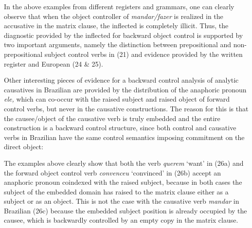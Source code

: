 \documentclass[output=paper]{langsci/langscibook}
\begin{document}
In the above examples from different registers and grammars, one can clearly observe that when the object controller of \textit{mandar\slash fazer} is realized in the accusative in the matrix clause, the inflected  is completely illicit. Thus, the diagnostic provided by the inflected  for backward object control is supported by two important arguments, namely the distinction between prepositional and non{}-prepositional subject control verbs in (21) and evidence provided by the written register and European  (24 \& 25).

Other interesting pieces of evidence for a backward control analysis of analytic causatives in Brazilian  are provided by the distribution of the anaphoric pronoun \textit{ele,} which can co-occur with the raised subject and raised object of forward control verbs, but never in the causative constructions. The reason for this is that the causee\slash object of the causative verb is truly embedded and the entire construction is a backward control structure, since both control and causative verbs in Brazilian  have the same control semantics imposing commitment on the direct object:

\ea%
    \label{ex:moreno:26}
    \z
\z
    
The examples above clearly show that both the  verb \textit{querem} ‘want’ in (26a) and the forward object control verb \textit{convenceu} ‘convinced’ in (26b) accept an anaphoric pronoun coindexed with the raised subject, because in both cases the subject of the embedded domain has raised to the matrix clause either as a subject or as an object. This is not the case with the causative verb \textit{mandar} in Brazilian  (26c) because the embedded subject position is already occupied by the causee, which is backwardly controlled by an empty copy in the matrix clause. 
\end{document}
